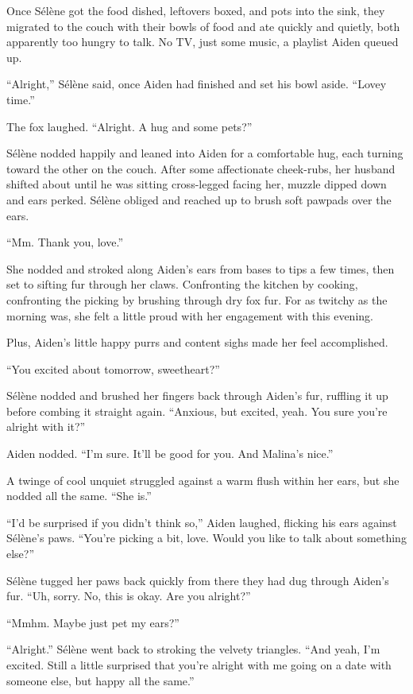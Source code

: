Once Sélène got the food dished, leftovers boxed, and pots into the sink, they migrated to the couch with their bowls of food and ate quickly and quietly, both apparently too hungry to talk. No TV, just some music, a playlist Aiden queued up.

``Alright,'' Sélène said, once Aiden had finished and set his bowl aside. ``Lovey time.''

The fox laughed. ``Alright. A hug and some pets?''

Sélène nodded happily and leaned into Aiden for a comfortable hug, each turning toward the other on the couch. After some affectionate cheek-rubs, her husband shifted about until he was sitting cross-legged facing her, muzzle dipped down and ears perked. Sélène obliged and reached up to brush soft pawpads over the ears.

``Mm. Thank you, love.''

She nodded and stroked along Aiden's ears from bases to tips a few times, then set to sifting fur through her claws. Confronting the kitchen by cooking, confronting the picking by brushing through dry fox fur. For as twitchy as the morning was, she felt a little proud with her engagement with this evening.

Plus, Aiden's little happy purrs and content sighs made her feel accomplished.

``You excited about tomorrow, sweetheart?''

Sélène nodded and brushed her fingers back through Aiden's fur, ruffling it up before combing it straight again. ``Anxious, but excited, yeah. You sure you're alright with it?''

Aiden nodded. ``I'm sure. It'll be good for you. And Malina's nice.''

A twinge of cool unquiet struggled against a warm flush within her ears, but she nodded all the same. ``She is.''

``I'd be surprised if you didn't think so,'' Aiden laughed, flicking his ears against Sélène's paws. ``You're picking a bit, love. Would you like to talk about something else?''

Sélène tugged her paws back quickly from there they had dug through Aiden's fur. ``Uh, sorry. No, this is okay. Are you alright?''

``Mmhm. Maybe just pet my ears?''

``Alright.'' Sélène went back to stroking the velvety triangles. ``And yeah, I'm excited. Still a little surprised that you're alright with me going on a date with someone else, but happy all the same.''

